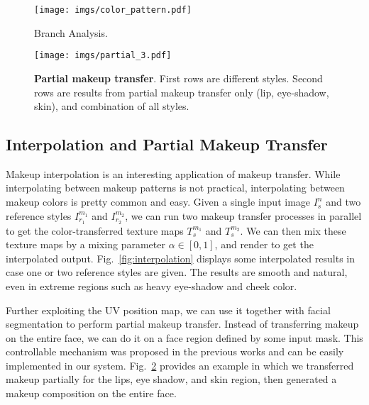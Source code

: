 \documentclass[final]{cvpr}
\newcommand{\Fref}[1]{Fig.~\ref{#1}}
\begin{document}
\begin{figure}[t]
\centering 
\texttt{[image: imgs/color\_pattern.pdf]}
\vskip -0.1in
   \caption{Branch Analysis.}
\label{fig:ablation_study_branch}
\vspace{-5mm}
\end{figure}


\begin{figure}[t]
\centering
\texttt{[image: imgs/partial\_3.pdf]}
\vskip -0.1in
   \caption{{\bf Partial makeup transfer}. First rows are different styles. Second rows are results from partial makeup transfer only (lip, eye-shadow, skin), and combination of all styles.}
\label{fig:partial}
\vspace{-5mm}
\end{figure}
\subsection{Interpolation and Partial Makeup Transfer}
\vspace{-2mm}
 Makeup interpolation is an interesting application of makeup transfer. While interpolating between makeup patterns is not practical, interpolating between makeup colors is pretty common and easy. Given a single input image $I_s^n$ and two reference styles $I_{r_1}^{m_1}$ and $I_{r_2}^{m_2}$, we can run two makeup transfer processes in parallel to get the color-transferred texture maps $T_{s}^{m_1}$ and $T_{s}^{m_2}$. We can then mix these texture maps by a mixing parameter $\alpha \in [0, 1]$, and render to get the interpolated output. \Fref{fig:interpolation} displays some interpolated results in case one or two reference styles are given. The results are smooth and natural, even in extreme regions such as heavy eye-shadow and cheek color.

 Further exploiting the UV position map, we can use it together with facial segmentation to perform partial makeup transfer. Instead of transferring makeup on the entire face, we can do it on a face region defined by some input mask. This controllable mechanism was proposed in the previous works \cite{beautyglow,jiang2019psgan} and can be easily implemented in our system. \Fref{fig:partial} provides an example in which we transferred makeup partially for the lips, eye shadow, and skin region, then generated a makeup composition on the entire face. 
\end{document}
